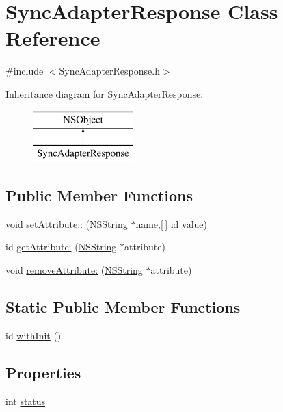 \hypertarget{interface_sync_adapter_response}{
\section{\-Sync\-Adapter\-Response \-Class \-Reference}
\label{interface_sync_adapter_response}
}


{\ttfamily \#include $<$\-Sync\-Adapter\-Response.\-h$>$}

\-Inheritance diagram for \-Sync\-Adapter\-Response\-:\begin{figure}[H]
\begin{center}
\leavevmode
\includegraphics[height=2.000000cm]{interface_sync_adapter_response}
\end{center}
\end{figure}
\subsection*{\-Public \-Member \-Functions}
\begin{DoxyCompactItemize}
\item 
void \hyperlink{interface_sync_adapter_response_a8510f0172977c9a67fe0eb998fc0e4c5}{set\-Attribute\-::} (\hyperlink{class_n_s_string}{\-N\-S\-String} $\ast$name,\mbox{[}$\,$\mbox{]} id value)
\item 
id \hyperlink{interface_sync_adapter_response_a51d106160c258a2f7a1fdc8ca8b7ed59}{get\-Attribute\-:} (\hyperlink{class_n_s_string}{\-N\-S\-String} $\ast$attribute)
\item 
void \hyperlink{interface_sync_adapter_response_ac48df0a7d4900cebfcb23ea85804d660}{remove\-Attribute\-:} (\hyperlink{class_n_s_string}{\-N\-S\-String} $\ast$attribute)
\end{DoxyCompactItemize}
\subsection*{\-Static \-Public \-Member \-Functions}
\begin{DoxyCompactItemize}
\item 
id \hyperlink{interface_sync_adapter_response_a7eaee32c643ae6cd47819514a8b315ee}{with\-Init} ()
\end{DoxyCompactItemize}
\subsection*{\-Properties}
\begin{DoxyCompactItemize}
\item 
int \hyperlink{interface_sync_adapter_response_a2d0aa8defd25f9e8209f4f03117989f3}{status}
\end{DoxyCompactItemize}


